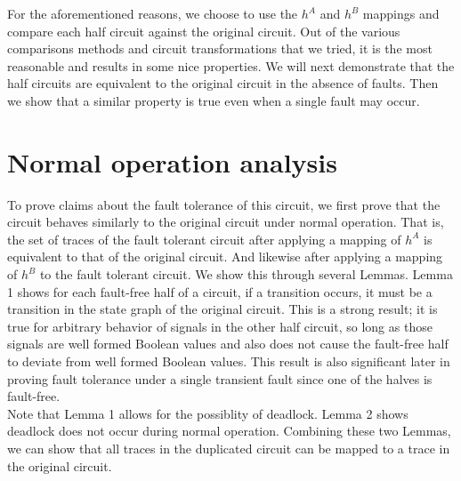 \documentclass[12pt]{report}
\begin{document}
For the aforementioned reasons, we choose to use the $h^A$ and $h^B$ mappings and compare each half circuit against the original circuit.  Out of the various comparisons methods and circuit transformations that we tried, it is the most reasonable and results in some nice properties.  We will next demonstrate that the half circuits are equivalent to the original circuit in the absence of faults.  Then we show that a similar property is true even when a single fault may occur.

\section{Normal operation analysis}
To prove claims about the fault tolerance of this circuit, we first prove that the circuit behaves similarly to the original circuit under normal operation.  That is, the set of traces of the fault tolerant circuit after applying a mapping of $h^A$ is equivalent to that of the original circuit.  And likewise after applying a mapping of $h^B$ to the fault tolerant circuit.  We show this through several Lemmas. Lemma 1 shows for each fault-free half of a circuit, if a transition occurs, it must be a transition in the state graph of the original circuit.  This is a strong result; it is true for arbitrary behavior of
signals in the other half circuit, so long as those signals are well formed Boolean values and also does not cause the fault-free half to deviate from well formed Boolean values.  
This result is also significant later in proving fault tolerance under a single transient fault since one of the halves is fault-free.  %
\\

Note that Lemma 1 allows for the possiblity of deadlock.  Lemma 2 shows deadlock does not occur during normal operation.  Combining these two Lemmas, we can show that all traces in the duplicated circuit can be mapped to a trace in the original circuit.\\
\end{document}
